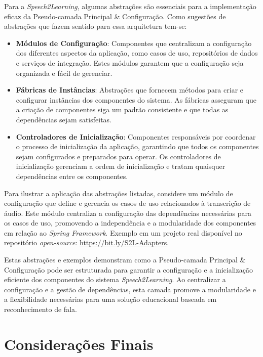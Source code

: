 Para a \textit{Speech2Learning}, algumas abstrações são essenciais para a implementação eficaz da Pseudo-camada Principal \& Configuração. Como sugestões de abstrações que fazem sentido para essa arquitetura tem-se:

\begin{itemize}
    \item \textbf{Módulos de Configuração}: Componentes que centralizam a configuração dos diferentes aspectos da aplicação, como casos de uso, repositórios de dados e serviços de integração. Estes módulos garantem que a configuração seja organizada e fácil de gerenciar.

    \item \textbf{Fábricas de Instâncias}: Abstrações que fornecem métodos para criar e configurar instâncias dos componentes do sistema. As fábricas asseguram que a criação de componentes siga um padrão consistente e que todas as dependências sejam satisfeitas.

    \item \textbf{Controladores de Inicialização}: Componentes responsáveis por coordenar o processo de inicialização da aplicação, garantindo que todos os componentes sejam configurados e preparados para operar. Os controladores de inicialização gerenciam a ordem de inicialização e tratam quaisquer dependências entre os componentes.
\end{itemize}

Para ilustrar a aplicação das abstrações listadas, considere um módulo de configuração que define e gerencia os casos de uso relacionados à transcrição de áudio. Este módulo centraliza a configuração das dependências necessárias para os casos de uso, promovendo a independência e a modularidade dos componentes em relação ao \textit{Spring Framework}. Exemplo em um projeto real disponível no repositório \textit{open-source}: \url{https://bit.ly/S2L-Adapters}.

Estas abstrações e exemplos demonstram como a Pseudo-camada Principal \& Configuração pode ser estruturada para garantir a configuração e a inicialização eficiente dos componentes do sistema \textit{Speech2Learning}. Ao centralizar a configuração e a gestão de dependências, esta camada promove a modularidade e a flexibilidade necessárias para uma solução educacional baseada em reconhecimento de fala.

\section{Considerações Finais}

